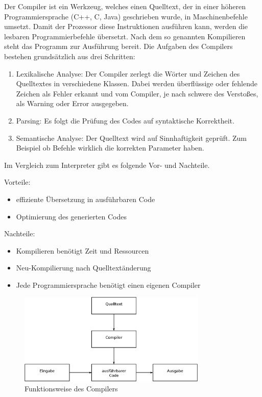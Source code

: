 Der Compiler ist ein Werkzeug, welches einen Quelltext, der in einer höheren Programmiersprache (C++, C, Java) geschrieben wurde, in Maschinenbefehle umsetzt.
 Damit der Prozessor diese Instruktionen ausführen kann, werden die lesbaren Programmierbefehle übersetzt. Nach dem so genannten Kompilieren steht das Programm zur Ausführung bereit.
Die Aufgaben des Compilers bestehen grundsätzlich aus drei Schritten:\cite{compiler}
\begin{enumerate}
  \item Lexikalische Analyse:
  	Der Compiler zerlegt die Wörter und Zeichen des Quelltextes in verschiedene Klassen. Dabei werden überflüssige oder fehlende Zeichen als Fehler erkannt und vom Compiler, je nach
  schwere des Verstoßes, als Warning oder Error ausgegeben.
  \item Parsing:
  	Es folgt die Prüfung des Codes auf syntaktische Korrektheit.
  \item Semantische Analyse: Der Quelltext wird auf Sinnhaftigkeit geprüft. Zum Beispiel ob Befehle wirklich die korrekten Parameter haben.
\end{enumerate}

Im Vergleich zum Interpreter gibt es folgende Vor- und Nachteile.

Vorteile:
\begin{itemize}
  \item effiziente Übersetzung in ausführbaren Code
  \item Optimierung des generierten Codes
\end{itemize}

Nachteile:
\begin{itemize}
  \item Kompilieren benötigt Zeit und Ressourcen
  \item Neu-Kompilierung nach Quelltextänderung
  \item Jede Programmiersprache benötigt einen eigenen Compiler
\end{itemize}

\begin{figure}[H]
\centering
\includegraphics[width=0.8\textwidth]{Hauptteil/Compiler.eps}
\caption{Funktionsweise des Compilers}\label{fig:compiler}
\end{figure}

